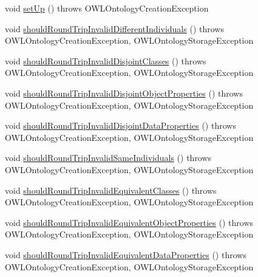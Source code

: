 \begin{DoxyCompactItemize}
\item 
void \hyperlink{classorg_1_1semanticweb_1_1owlapi_1_1api_1_1test_1_1syntax_1_1_invalid_axiom_round_trip_test_case_a5daaaad9d1e77f6589942f019cf757be}{set\-Up} ()  throws O\-W\-L\-Ontology\-Creation\-Exception 
\item 
void \hyperlink{classorg_1_1semanticweb_1_1owlapi_1_1api_1_1test_1_1syntax_1_1_invalid_axiom_round_trip_test_case_a2df9693d20f783f2f5a3ba8ba98f6076}{should\-Round\-Trip\-Invalid\-Different\-Individuals} ()  throws O\-W\-L\-Ontology\-Creation\-Exception, O\-W\-L\-Ontology\-Storage\-Exception 
\item 
void \hyperlink{classorg_1_1semanticweb_1_1owlapi_1_1api_1_1test_1_1syntax_1_1_invalid_axiom_round_trip_test_case_a132caf0613a616fb197789a19ce248b1}{should\-Round\-Trip\-Invalid\-Disjoint\-Classes} ()  throws O\-W\-L\-Ontology\-Creation\-Exception, O\-W\-L\-Ontology\-Storage\-Exception 
\item 
void \hyperlink{classorg_1_1semanticweb_1_1owlapi_1_1api_1_1test_1_1syntax_1_1_invalid_axiom_round_trip_test_case_ae89b26e3e804fa58a1af7e508705f163}{should\-Round\-Trip\-Invalid\-Disjoint\-Object\-Properties} ()  throws O\-W\-L\-Ontology\-Creation\-Exception, O\-W\-L\-Ontology\-Storage\-Exception 
\item 
void \hyperlink{classorg_1_1semanticweb_1_1owlapi_1_1api_1_1test_1_1syntax_1_1_invalid_axiom_round_trip_test_case_a880b2ba3e3847989d9bed960077e403b}{should\-Round\-Trip\-Invalid\-Disjoint\-Data\-Properties} ()  throws O\-W\-L\-Ontology\-Creation\-Exception, O\-W\-L\-Ontology\-Storage\-Exception 
\item 
void \hyperlink{classorg_1_1semanticweb_1_1owlapi_1_1api_1_1test_1_1syntax_1_1_invalid_axiom_round_trip_test_case_a4aa5461f61107b930b1311314c597647}{should\-Round\-Trip\-Invalid\-Same\-Individuals} ()  throws O\-W\-L\-Ontology\-Creation\-Exception, O\-W\-L\-Ontology\-Storage\-Exception 
\item 
void \hyperlink{classorg_1_1semanticweb_1_1owlapi_1_1api_1_1test_1_1syntax_1_1_invalid_axiom_round_trip_test_case_a7364d5e0ede5198fcb409b9ec9f52850}{should\-Round\-Trip\-Invalid\-Equivalent\-Classes} ()  throws O\-W\-L\-Ontology\-Creation\-Exception, O\-W\-L\-Ontology\-Storage\-Exception 
\item 
void \hyperlink{classorg_1_1semanticweb_1_1owlapi_1_1api_1_1test_1_1syntax_1_1_invalid_axiom_round_trip_test_case_aef68c3814d01e5818a4268bfeb845084}{should\-Round\-Trip\-Invalid\-Equivalent\-Object\-Properties} ()  throws O\-W\-L\-Ontology\-Creation\-Exception, O\-W\-L\-Ontology\-Storage\-Exception 
\item 
void \hyperlink{classorg_1_1semanticweb_1_1owlapi_1_1api_1_1test_1_1syntax_1_1_invalid_axiom_round_trip_test_case_a90f68a92ee078e970c772a0a89a76ed6}{should\-Round\-Trip\-Invalid\-Equivalent\-Data\-Properties} ()  throws O\-W\-L\-Ontology\-Creation\-Exception, O\-W\-L\-Ontology\-Storage\-Exception 
\end{DoxyCompactItemize}
